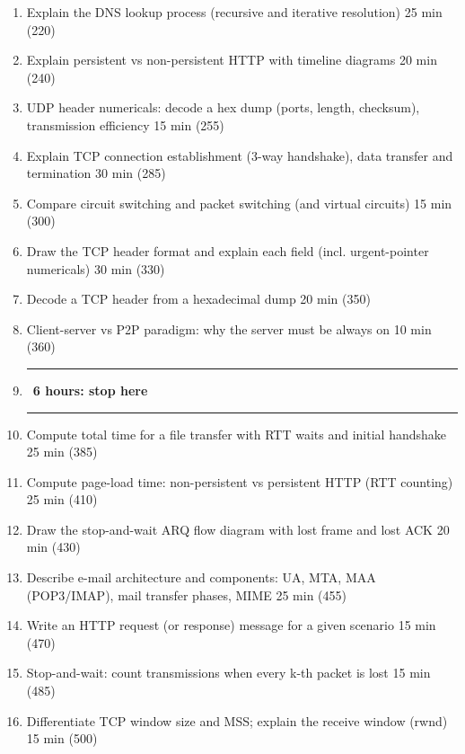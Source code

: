 \begin{enumerate}[itemsep=0pt]
\item Explain the DNS lookup process (recursive and iterative resolution)  {\scriptsize\color{muted}25 min (220)}
\item Explain persistent vs non-persistent HTTP with timeline diagrams  {\scriptsize\color{muted}20 min (240)}
\item UDP header numericals: decode a hex dump (ports, length, checksum), transmission efficiency  {\scriptsize\color{muted}15 min (255)}
\item Explain TCP connection establishment (3-way handshake), data transfer and termination  {\scriptsize\color{muted}30 min (285)}
\item Compare circuit switching and packet switching (and virtual circuits)  {\scriptsize\color{muted}15 min (300)}
\item Draw the TCP header format and explain each field (incl. urgent-pointer numericals)  {\scriptsize\color{muted}30 min (330)}
\item Decode a TCP header from a hexadecimal dump  {\scriptsize\color{muted}20 min (350)}
\item Client-server vs P2P paradigm: why the server must be always on  {\scriptsize\color{muted}10 min (360)}
\item[] \textcolor{sgamber}{\rule[0.5ex]{3em}{0.6pt}\ \textbf{6 hours: stop here}\ \rule[0.5ex]{3em}{0.6pt}}
\item Compute total time for a file transfer with RTT waits and initial handshake  {\scriptsize\color{muted}25 min (385)}
\item Compute page-load time: non-persistent vs persistent HTTP (RTT counting)  {\scriptsize\color{muted}25 min (410)}
\item Draw the stop-and-wait ARQ flow diagram with lost frame and lost ACK  {\scriptsize\color{muted}20 min (430)}
\item Describe e-mail architecture and components: UA, MTA, MAA (POP3/IMAP), mail transfer phases, MIME  {\scriptsize\color{muted}25 min (455)}
\item Write an HTTP request (or response) message for a given scenario  {\scriptsize\color{muted}15 min (470)}
\item Stop-and-wait: count transmissions when every k-th packet is lost  {\scriptsize\color{muted}15 min (485)}
\item Differentiate TCP window size and MSS; explain the receive window (rwnd)  {\scriptsize\color{muted}15 min (500)}

\end{enumerate}

